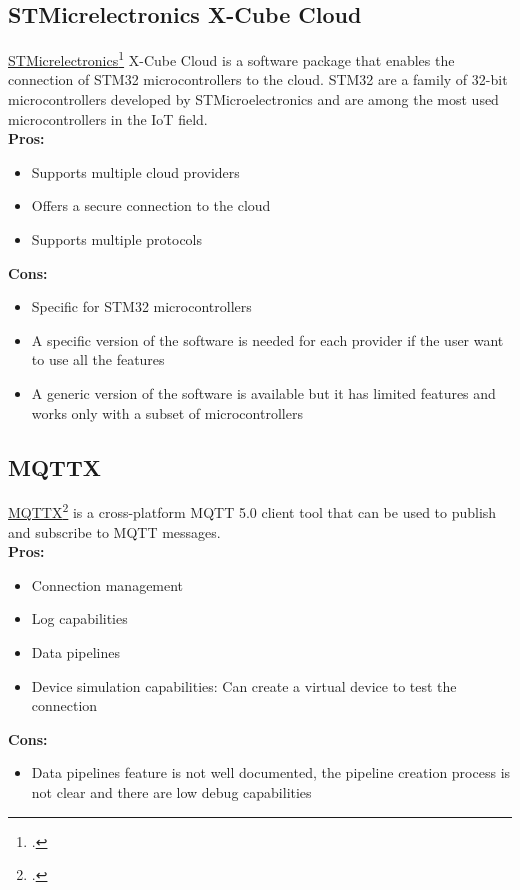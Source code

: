 \subsection{STMicrelectronics X-Cube Cloud}
\label{stm}
\href{https://www.st.com/}{STMicrelectronics}\footcite{site:st-micro} X-Cube Cloud is a software package that enables the connection of STM32 microcontrollers to the cloud. STM32 are a family of 32-bit microcontrollers developed by STMicroelectronics and are among the most used microcontrollers in the IoT field.\\
\textbf{Pros:}
\begin{itemize}
    \item Supports multiple cloud providers
    \item Offers a secure connection to the cloud
    \item Supports multiple protocols
\end{itemize}
\textbf{Cons:}
\begin{itemize}
    \item Specific for STM32 microcontrollers
    \item A specific version of the software is needed for each provider if the user want to use all the features 
    \item A generic version of the software is available but it has limited features and works only with a subset of microcontrollers
\end{itemize}

\subsection{MQTTX}
\label{mqttx}
\href{https://mqttx.app/}{MQTTX}\footcite{site:mqttx} is a cross-platform MQTT 5.0 client tool that can be used to publish and subscribe to MQTT messages.\\
\textbf{Pros:}
\begin{itemize}
    \item Connection management
    \item Log capabilities
    \item Data pipelines
    \item Device simulation capabilities: Can create a virtual device to test the connection
\end{itemize}
\textbf{Cons:}
\begin{itemize}
    \item Data pipelines feature is not well documented, the pipeline creation process is not clear and there are low debug capabilities
\end{itemize}

